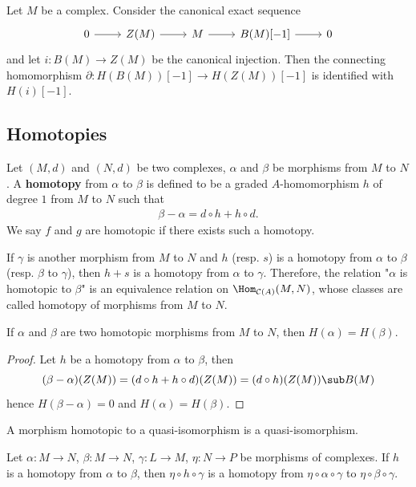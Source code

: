 \begin{example}
Let $M$ be a complex. Consider the canonical exact sequence
\[\begin{tikzcd}
0\ar[r]&Z(M)\ar[r]&M\ar[r]&B(M)[-1]\ar[r]&0
\end{tikzcd}\]
and let $i:B(M)\to Z(M)$ be the canonical injection. Then the connecting homomorphism $\partial:H(B(M))[-1]\to H(Z(M))[-1]$ is identified with $H(i)[-1]$. 
\end{example}
\subsection{Homotopies}
Let $(M,d)$ and $(N,d)$ be two complexes, $\alpha$ and $\beta$ be morphisms from $M$ to $N$. A \textbf{homotopy} from $\alpha$ to $\beta$ is defined to be a graded $A$-homomorphism $h$ of degree $1$ from $M$ to $N$ such that
\begin{align}\label{module complex homotopy def}
\beta-\alpha=d\circ h+h\circ d.
\end{align}
We say $f$ and $g$ are homotopic if there exists such a homotopy.\par
If $\gamma$ is another morphism from $M$ to $N$ and $h$ (resp. $s$) is a homotopy from $\alpha$ to $\beta$ (resp. $\beta$ to $\gamma$), then $h+s$ is a homotopy from $\alpha$ to $\gamma$. Therefore, the relation "$\alpha$ is homotopic to $\beta$" is an equivalence relation on $\Hom_{\mathcal{C}(A)}(M,N)$, whose classes are called homotopy of morphisms from $M$ to $N$.
\begin{proposition}\label{module complex homotopy same map on homology}
If $\alpha$ and $\beta$ are two homotopic morphisms from $M$ to $N$, then $H(\alpha)=H(\beta)$.
\end{proposition}
\begin{proof}
Let $h$ be a homotopy from $\alpha$ to $\beta$, then
\[(\beta-\alpha)(Z(M))=(d\circ h+h\circ d)(Z(M))=(d\circ h)(Z(M))\sub B(M)\]
hence $H(\beta-\alpha)=0$ and $H(\alpha)=H(\beta)$.
\end{proof}
\begin{corollary}
A morphism homotopic to a quasi-isomorphism is a quasi-isomorphism.
\end{corollary}
\begin{proposition}\label{module complex homotopy composition}
Let $\alpha:M\to N$, $\beta:M\to N$, $\gamma:L\to M$, $\eta:N\to P$ be morphisms of complexes. If $h$ is a homotopy from $\alpha$ to $\beta$, then $\eta\circ h\circ\gamma$ is a homotopy from $\eta\circ\alpha\circ\gamma$ to $\eta\circ\beta\circ\gamma$.
\end{proposition}
